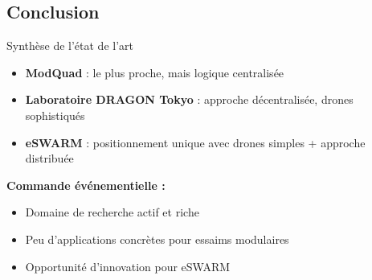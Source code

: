 \subsection{Conclusion}

\begin{frame}[c]{Synthèse de l'état de l'art}
    \vfill
    \begin{itemize}
        \item \textbf{ModQuad} : le plus proche, mais logique centralisée
        \item \textbf{Laboratoire DRAGON Tokyo} : approche décentralisée, drones sophistiqués
        \item \textbf{eSWARM} : positionnement unique avec drones simples + approche distribuée
    \end{itemize}
    
    \vspace{0.5cm}
    \textbf{Commande événementielle :}
    \begin{itemize}
        \item Domaine de recherche actif et riche
        \item Peu d'applications concrètes pour essaims modulaires
        \item Opportunité d'innovation pour eSWARM
    \end{itemize}
\end{frame}

